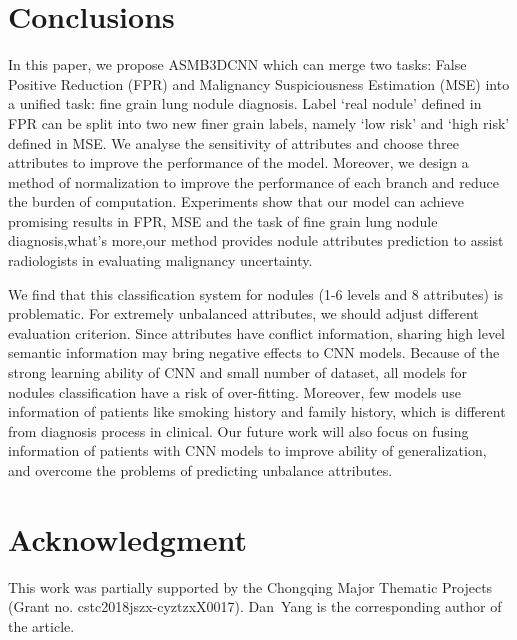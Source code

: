 \documentclass[runningheads]{llncs}
\begin{document}
\section{Conclusions}
\label{conclude}
In this paper, we propose ASMB3DCNN which can merge two tasks: False Positive Reduction (FPR) and Malignancy Suspiciousness Estimation (MSE) into a unified task: fine grain lung nodule diagnosis. Label `real nodule' defined in FPR can be split into two new finer grain labels, namely `low risk' and `high risk' defined in MSE.
We analyse the sensitivity of attributes and choose three attributes to improve the performance of the model.
Moreover, we design a method of normalization to improve the performance of each branch and reduce the burden of computation.
Experiments show that our model can achieve promising results in FPR, MSE and the task of fine grain lung nodule diagnosis,what's more,our method provides nodule attributes prediction to assist radiologists in evaluating malignancy uncertainty.

We find that this classification system for nodules (1-6 levels and 8 attributes) is problematic. For extremely unbalanced attributes, we should adjust different evaluation criterion. Since attributes have conflict information,  sharing high level semantic information may bring negative effects to CNN models. 
Because of the strong learning ability of CNN and small number of dataset, all models for nodules classification have a risk of over-fitting. Moreover, few models use information of patients like smoking history and family history, which is different from diagnosis process in clinical. Our future work will also focus on fusing information of patients with CNN models to improve ability of generalization, and overcome the problems of predicting unbalance attributes.
 
\section*{Acknowledgment}
This work was partially supported by the Chongqing Major Thematic Projects (Grant no. cstc2018jszx-cyztzxX0017). Dan~Yang is the corresponding author of the article.

%

%
%
\end{document}
